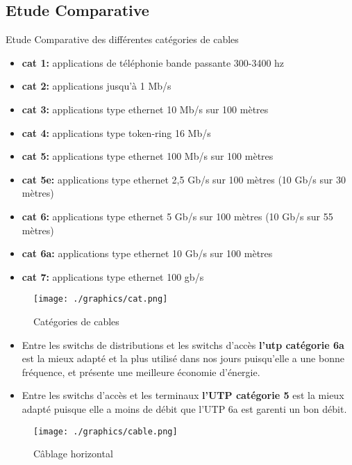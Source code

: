 \documentclass[12pt,a4paper]{report}
\begin{document}
		\subsection{Etude Comparative}
			Etude Comparative des différentes catégories de cables\\
		\begin{itemize}

			\item \textbf{cat 1:} applications de téléphonie bande passante 300-3400 hz 
			\item \textbf{cat 2:} applications jusqu'à 1 Mb/s 
			\item \textbf{cat 3:} applications type ethernet 10 Mb/s sur 100 mètres
			\item \textbf{cat 4:} applications type token-ring 16 Mb/s 
			\item \textbf{cat 5:} applications type ethernet 100 Mb/s sur 100 mètres 
			\item \textbf{cat 5e:} applications type ethernet 2,5 Gb/s sur 100 mètres (10 Gb/s sur 30  mètres)
			\item \textbf{cat 6:} applications type ethernet 5 Gb/s sur 100 mètres (10 Gb/s sur 55  mètres)
			\item \textbf{cat 6a:} applications type ethernet 10 Gb/s sur 100 mètres
			\item \textbf{cat 7:} applications type ethernet 100 gb/s	
		\end{itemize}
		\newpage
		\begin{figure}[!hbtp]
			\centering
			\texttt{[image: ./graphics/cat.png]}
			\caption{Catégories de cables}
		\end{figure}


		\begin{itemize}

			\item  Entre les switchs de distributions et les switchs d'accès \textbf{l’\ac{utp} catégorie 6a} est la mieux adapté et la plus utilisé dans nos jours puisqu’elle a une
bonne fréquence, et présente une meilleure économie d’énergie. 
			\item Entre les switchs d'accès et les terminaux \textbf{l’UTP catégorie 5} est la mieux adapté puisque elle a moins de débit que l'UTP 6a est garenti un bon débit.	
		\end{itemize}
		
		\begin{figure}[!hbtp]
			\centering
			\texttt{[image: ./graphics/cable.png]}
			\caption{Câblage horizontal}
		\end{figure}
\end{document}
